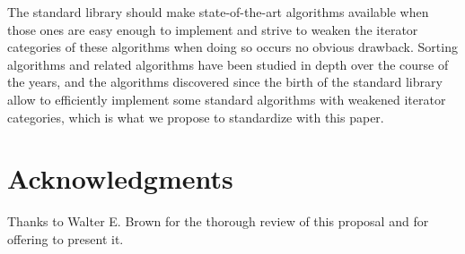 \documentclass{isocpp_proposal}
\begin{document}
The standard library should make state-of-the-art algorithms available when those ones are easy enough to implement and strive to weaken the iterator categories of these algorithms when doing so occurs no obvious drawback. Sorting algorithms and related algorithms have been studied in depth over the course of the years, and the algorithms discovered since the birth of the standard library allow to efficiently implement some standard algorithms with weakened iterator categories, which is what we propose to standardize with this paper.

\section{Acknowledgments}

Thanks to Walter E. Brown for the thorough review of this proposal and for offering to present it.
\end{document}
